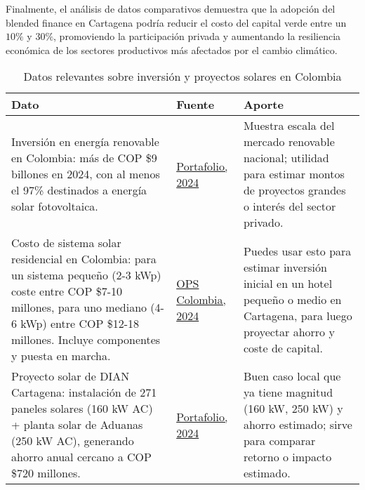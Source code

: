 Finalmente, el análisis de datos comparativos demuestra que la adopción del blended finance en Cartagena podría reducir el costo del capital verde entre un $10\%$ y $30\%$, promoviendo la participación privada y aumentando la resiliencia económica de los sectores productivos más afectados por el cambio climático.

\begin{table}[H]
    \small
    \setlength{\tabcolsep}{6pt}
    \renewcommand{\arraystretch}{1.2}
    \begin{tabularx}{\textwidth}{|p{}|p{}|p{}|}
        \hline
        \textbf{Dato} & \textbf{Fuente} & \textbf{Aporte} \\
        \hline
        Inversión en energía renovable en Colombia: más de COP \$9 billones en 2024, con al menos el 97\% destinados a energía solar fotovoltaica. &
        \href{https://www.portafolio.co/sostenibilidad/colombia-alcanzo-record-de-inversion-en-energia-renovable-con-mas-de-9-billones-de-pesos-en-2024-633474}{Portafolio, 2024} &
        Muestra escala del mercado renovable nacional; utilidad para estimar montos de proyectos grandes o interés del sector privado. \\
        \hline
        Costo de sistema solar residencial en Colombia: para un sistema pequeño (2-3 kWp) coste entre COP \$7-10 millones, para uno mediano (4-6 kWp) entre COP \$12-18 millones. Incluye componentes y puesta en marcha. &
        \href{https://www.opscolombia.com/blog/cuanto-cuesta-realmente-un-sistema-solar-en-colombia}{OPS Colombia, 2024} &
        Puedes usar esto para estimar inversión inicial en un hotel pequeño o medio en Cartagena, para luego proyectar ahorro y coste de capital. \\
        \hline
        Proyecto solar de DIAN Cartagena: instalación de 271 paneles solares (160 kW AC) + planta solar de Aduanas (250 kW AC), generando ahorro anual cercano a COP \$720 millones. &
        \href{https://www.portafolio.co/energia/de-impuestos-a-sostenibilidad-asi-avanza-la-dian-con-solar-en-cartagena-639503}{Portafolio, 2024} &
        Buen caso local que ya tiene magnitud (160 kW, 250 kW) y ahorro estimado; sirve para comparar retorno o impacto estimado. \\
        \hline
    \end{tabularx}
    \caption{Datos relevantes sobre inversión y proyectos solares en Colombia}
\end{table}